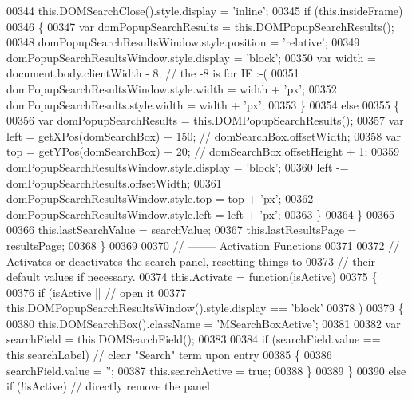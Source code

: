 \begin{DoxyCode}
00344        this.DOMSearchClose().style.display = \textcolor{stringliteral}{'inline'};
00345        \textcolor{keywordflow}{if} (this.insideFrame)
00346        \{
00347          var domPopupSearchResults = this.DOMPopupSearchResults();
00348          domPopupSearchResultsWindow.style.position = \textcolor{stringliteral}{'relative'};
00349          domPopupSearchResultsWindow.style.display  = \textcolor{stringliteral}{'block'};
00350          var width = document.body.clientWidth - 8; \textcolor{comment}{// the -8 is for IE :-(}
00351          domPopupSearchResultsWindow.style.width    = width + \textcolor{stringliteral}{'px'};
00352          domPopupSearchResults.style.width          = width + \textcolor{stringliteral}{'px'};
00353        \}
00354        \textcolor{keywordflow}{else}
00355        \{
00356          var domPopupSearchResults = this.DOMPopupSearchResults();
00357          var left = getXPos(domSearchBox) + 150; \textcolor{comment}{// domSearchBox.offsetWidth;}
00358          var top  = getYPos(domSearchBox) + 20;  \textcolor{comment}{// domSearchBox.offsetHeight + 1;}
00359          domPopupSearchResultsWindow.style.display = \textcolor{stringliteral}{'block'};
00360          left -= domPopupSearchResults.offsetWidth;
00361          domPopupSearchResultsWindow.style.top     = top  + \textcolor{stringliteral}{'px'};
00362          domPopupSearchResultsWindow.style.left    = left + \textcolor{stringliteral}{'px'};
00363        \}
00364     \}
00365 
00366     this.lastSearchValue = searchValue;
00367     this.lastResultsPage = resultsPage;
00368   \}
00369 
00370   \textcolor{comment}{// -------- Activation Functions}
00371 
00372   \textcolor{comment}{// Activates or deactivates the search panel, resetting things to}
00373   \textcolor{comment}{// their default values if necessary.}
00374   this.Activate = \textcolor{keyword}{function}(isActive)
00375   \{
00376     \textcolor{keywordflow}{if} (isActive || \textcolor{comment}{// open it}
00377         this.DOMPopupSearchResultsWindow().style.display == \textcolor{stringliteral}{'block'}
00378        )
00379     \{
00380       this.DOMSearchBox().className = \textcolor{stringliteral}{'MSearchBoxActive'};
00381 
00382       var searchField = this.DOMSearchField();
00383 
00384       \textcolor{keywordflow}{if} (searchField.value == \textcolor{keyword}{this}.searchLabel) \textcolor{comment}{// clear "Search" term upon entry}
00385       \{
00386         searchField.value = \textcolor{stringliteral}{''};
00387         this.searchActive = \textcolor{keyword}{true};
00388       \}
00389     \}
00390     \textcolor{keywordflow}{else} \textcolor{keywordflow}{if} (!isActive) \textcolor{comment}{// directly remove the panel}

\end{DoxyCode}
